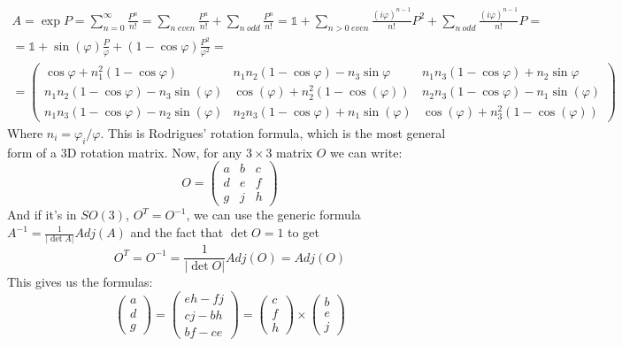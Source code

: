 \documentclass{article}
\begin{document}
\begin{equation}
\begin{gathered}
    A = \exp P = \sum_{n=0}^{\infty} \frac{P^n}{n!} =
    \sum_{n \ even}\frac{P^n}{n!} + \sum_{n \ odd}\frac{P^n}{n!} = 
    \mathbb{1} + \sum_{n > 0 \ even}\frac{(i\varphi)^{n - 1}}{n!}P^2 + \sum_{n \ odd}\frac{(i\varphi)^{n-1}}{n!}P = 
    \\
    = \mathbb{1} + \sin(\varphi)\frac{P}{\varphi} + \left(1 - \cos\varphi\right)\frac{P^2}{\varphi^2} =
    \\
    = \begin{pmatrix}
        \cos\varphi + n_1^2\left(1 - \cos\varphi\right) &
        n_1n_2\left(1 - \cos\varphi\right) - n_3 \sin\varphi &
        n_1n_3\left(1 - \cos\varphi\right) + n_2 \sin\varphi \\
        n_1n_2\left(1 - \cos\varphi\right) - n_3 \sin(\varphi) &
        \cos(\varphi) + n_2^2\left(1 - \cos(\varphi)\right) &
        n_2n_3\left(1 - \cos\varphi\right) - n_1 \sin(\varphi) \\
        n_1n_3\left(1 - \cos\varphi\right) - n_2 \sin(\varphi) &
        n_2n_3\left(1 - \cos\varphi\right) + n_1 \sin(\varphi) &
        \cos(\varphi) + n_3^2\left(1 - \cos(\varphi)\right)
    \end{pmatrix}
\end{gathered}
\end{equation}
Where $n_i = \varphi_i/\varphi$. This is Rodrigues' rotation formula, which is the most general form of a 3D rotation matrix.
\newline
Now, for any $3\times3$ matrix $O$ we can write:
\begin{equation}
    O = \begin{pmatrix}
        a & b & c \\ d & e & f \\ g & j & h
    \end{pmatrix}
\end{equation} 
And if it's in $SO(3)$, $O^T = O^{-1}$, we can use the generic formula $A^{-1} = \frac{1}{|\det A|}Adj(A)$ and the fact that $\det O = 1$ to get
\begin{equation}
    O^T = O^{-1} = \frac{1}{|\det O|}Adj(O) = Adj(O)
\end{equation}
This gives us the formulas:
\begin{equation}
    \begin{pmatrix} a \\ d \\ g \end{pmatrix} = \begin{pmatrix} eh - fj \\ cj - bh \\ bf - ce \end{pmatrix} = \begin{pmatrix}
        c \\ f \\ h
    \end{pmatrix} \times \begin{pmatrix}
        b \\ e \\ j
    \end{pmatrix}
\end{equation}
\end{document}
